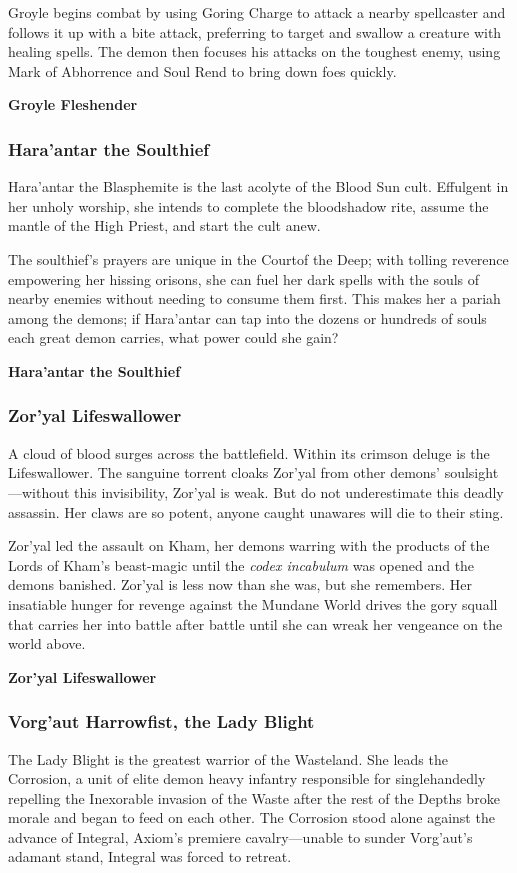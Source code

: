 \documentclass[10pt,a4paper,twoside,bg=print,twocolumn,openany,nodeprecatedcode]{dndbook}
\begin{document}
Groyle begins combat by using Goring Charge to attack a nearby spellcaster and follows it up with a bite attack, preferring to target and swallow a creature with healing spells. The demon then focuses his attacks on the toughest enemy, using Mark of Abhorrence and Soul Rend to bring down foes quickly.

\textbf{Groyle Fleshender}

\subsubsection{Hara'antar the Soulthief}
Hara'antar the Blasphemite is the last acolyte of the Blood Sun cult. Effulgent in her unholy worship, she intends to complete the bloodshadow rite, assume the mantle of the High Priest, and start the cult anew.

The soulthief's prayers are unique in the Courtof the Deep; with tolling reverence empowering her hissing orisons, she can fuel her dark spells with the souls of nearby enemies without needing to consume them first. This makes her a pariah among the demons; if Hara'antar can tap into the dozens or hundreds of souls each great demon carries, what power could she gain?

\textbf{Hara'antar the Soulthief}

\subsubsection{Zor'yal Lifeswallower}
A cloud of blood surges across the battlefield. Within its crimson deluge is the Lifeswallower. The sanguine torrent cloaks Zor'yal from other demons' soulsight—without this invisibility, Zor'yal is weak. But do not underestimate this deadly assassin. Her claws are so potent, anyone caught unawares will die to their sting.

Zor'yal led the assault on Kham, her demons warring with the products of the Lords of Kham's beast-magic until the \textit{codex incabulum} was opened and the demons banished. Zor'yal is less now than she was, but she remembers. Her insatiable hunger for revenge against the Mundane World drives the gory squall that carries her into battle after battle until she can wreak her vengeance on the world above.

\textbf{Zor'yal Lifeswallower}

\subsubsection{Vorg'aut Harrowfist, the Lady Blight}
The Lady Blight is the greatest warrior of the Wasteland. She leads the Corrosion, a unit of elite demon heavy infantry responsible for singlehandedly repelling the Inexorable invasion of the Waste after the rest of the Depths broke morale and began to feed on each other. The Corrosion stood alone against the advance of Integral, Axiom's premiere cavalry—unable to sunder Vorg'aut's adamant stand, Integral was forced to retreat.
\end{document}
